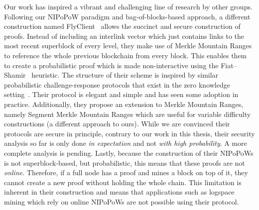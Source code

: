 Our work has inspired a vibrant and challenging line of research by other
groups. Following our NIPoPoW paradigm and bag-of-blocks-based approach, a
different construction named FlyClient~\cite{flyclient} allows the succinct and
secure construction of proofs. Instead of including an interlink vector
which just contains links to the most recent superblock of every level, they
make use of Merkle Mountain Ranges to reference the whole previous blockchain
from every block. This enables them to create a probabilistic proof which is
made non-interactive using the Fiat--Shamir~\cite{fiatshamir} heuristic. The
structure of their scheme is inspired by similar probabilistic
challenge-response protocols that exist in the zero knowledge
setting~\cite{schnorr}. Their protocol is elegant and simple and has seen some
adoption in practice. Additionally, they propose an extension to Merkle
Mountain Ranges, namely Segment Merkle Mountain Ranges which are useful for
variable difficulty constructions (a different approach to ours). While we are
convinced their protocols are secure in principle, contrary to our work in this
thesis, their security analysis so far is only done \emph{in expectation} and
not \emph{with high probability}. A more complete analysis is pending. Lastly,
because the construction of their NIPoPoWs is not superblock-based, but
probabilistic, this means that these proofs are not \emph{online}. Therefore,
if a full node has a proof and mines a block on top of it, they cannot create a
new proof without holding the whole chain. This limitation is inherent in their
construction and means that applications such as logspace mining which rely on
online NIPoPoWs are not possible using their protocol.

